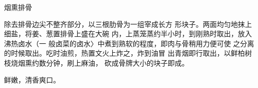 \begin{recipe}{烟熏排骨}

\ingredients




\cooking

除去排骨边尖不整齐部分，以三根肋骨为一组宰成长方 形块子。两面均匀地抹上细盐，将姜、葱置排骨上盛在大碗 内，上蒸笼蒸约半小时，到刚熟时取出，放入沸热卤水（一 般卤菜的卤水〉中煮到熟软的程度，即肉与骨稍用力便可使 之分离的时候取出。吃时油煎，热置文火上炸之，炸到油冒 出青烟即行取出，以鲜柏树枝烧烟熏约数分钟，刷上麻油， 砍成骨牌大小的块子即成。

\notes

鲜嫩，清香爽口。

\end{recipe}


